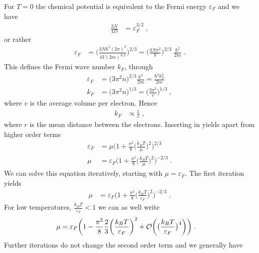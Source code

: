 %
For $T=0$ the chemical potential is equivalent to the Fermi energy $\varepsilon_{F}$ and we have
%
\begin{align}\label{eq:spin:para:aux1}
\frac{3 N}{4 D} &= \varepsilon_{F}^{3/2}\;,
\end{align}
%
or rather
%
\begin{align*}
\varepsilon_{F} 
&=  \bigg(\frac{3 N \hbar^{3}  (2\pi)^{2} }{4 V(2m)^{3/2}} \bigg)^{2/3}
=  \bigg(\frac{3 N   \pi^{2} }{ V} \bigg)^{2/3}\;\frac{\hbar^{2}}{2 m}\;.
\end{align*}
%
%
This defines the Fermi wave number $k_{F}$, through
%
\begin{align*}
\varepsilon_{F} &
= \bigg(3  \pi^{2} n\bigg)^{2/3}\frac{\hbar^{2}}{2m} 
= \frac{\hbar^{2}	k_{F}^{2} }{2m}\\
k_{F}&=\bigg(3  \pi^{2} n\bigg)^{1/3} = \bigg(\frac{3 \pi^{2}}{v}\bigg)^{1/3 }\;,
\end{align*}
%
where $v$ is the average volume per electron. Hence 
%
\begin{align*}
k_{F} &\propto \frac{1}{r}\;,
\end{align*}
%
where $r$ is the mean distance between the electrons.
Inserting  in  yields apart from higher order terms
%
\begin{align*}
\varepsilon_{F}
&= \mu\bigg(1 +\frac{\pi^{2}}{8}\bigg(\frac{ k_{B}T }{\mu}\bigg)^{2}\bigg)^{2/3}\\
\mu &= \varepsilon_{F}\bigg(1 +\frac{\pi^{2}}{8}\bigg(\frac{ k_{B}T }{\mu}\bigg)^{2}\bigg)^{-2/3}\;.
\end{align*}
%
We can solve this equation iteratively, starting with 
$\mu=\varepsilon_{F}$. The first iteration yields
%
\begin{align*}
\mu &=\varepsilon_{F}\bigg(1 +\frac{\pi^{2}}{8}\bigg(\frac{ k_{B}T }{\varepsilon_{F}}\bigg)^{2}\bigg)^{-2/3}\;.
\end{align*}
%
For low temperatures, 
$\frac{ k_{B}T }{\varepsilon_{F}}<1$ we can as well write
\begin{align*}
\mu &=\varepsilon_{F}\bigg(1 -\frac{\pi^{2}}{8}\frac{2}{3}\bigg(\frac{ k_{B}T }{\varepsilon_{F}}\bigg)^{2} +{\cal O}\bigg( \big( \frac{k_{B}T}{\varepsilon_{F}} \big)^{4} \bigg)\bigg)\;.
\end{align*}
%
Further iterations do not change the second order term and we generally have
%
%

